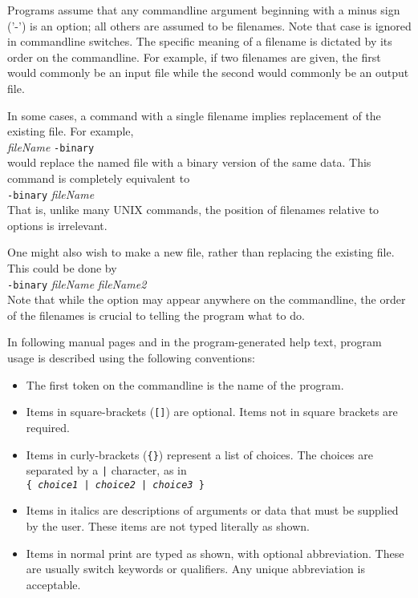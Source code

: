 \documentclass[11pt]{article}
\begin{document}
Programs assume that any commandline argument beginning with a minus sign ('-') is an option; all others are
assumed to be filenames.  Note that case is ignored in commandline switches.  The specific meaning of a
filename is dictated by its order on the commandline.  For example, if two filenames are given, the first
would commonly be an input file while the second would commonly be an output file.  

In some cases, a command with a single filename implies replacement of the existing file.  For example,\\
\hspace*{5mm}{\tt sddsconvert} {\em fileName} {\tt -binary}\\
would replace the named file with a binary version of the same data.   This command is completely equivalent to\\
\hspace*{5mm}{\tt sddsconvert} {\tt -binary} {\em fileName} \\
That is, unlike many UNIX commands, the position of filenames relative to options is irrelevant.

One might also wish to make a new file, rather than replacing the existing file.  This could be done by\\
\hspace*{5mm}{\tt sddsconvert} {\tt -binary} {\em fileName} {\em fileName2} \\
Note that while the option may appear anywhere on the commandline, the order of the filenames is crucial to
telling the program what to do.

In following manual pages and in the program-generated help text, program usage is described using the following
conventions:
\begin{itemize}
\item The first token on the commandline  is the name of the program.
\item Items in square-brackets ({\tt []}) are optional.  Items not in square brackets are required.
\item Items in curly-brackets ({\tt \{\}}) represent a list of choices.  The choices are separated by
a \verb.|. character, as in\\
{\tt \{ {\em choice1} | {\em choice2} | {\em choice3} \}}
\item Items in italics are descriptions of arguments or data that must be supplied by the user.  These items are not typed 
literally as shown.
\item Items in normal print are typed as shown, with optional abbreviation.  These are
usually switch keywords or qualifiers.  Any unique abbreviation is acceptable.
\end{itemize}
\end{document}
